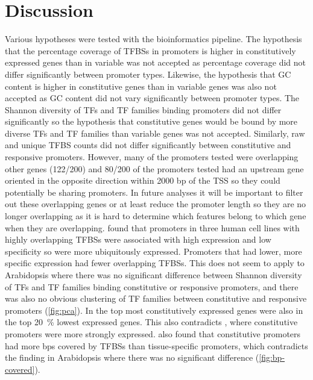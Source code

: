 \section{Discussion}{\label{discussion}}

Various hypotheses were tested with the bioinformatics pipeline. The hypothesis that the percentage coverage of TFBSs in promoters is higher in constitutively expressed genes than in variable was not accepted as percentage coverage did not differ significantly between promoter types.
Likewise, the hypothesis that  GC content is higher in constitutive genes than in variable genes was also not accepted as GC content did not vary significantly between promoter types. 
The Shannon diversity of TFs and TF families binding promoters did not differ significantly so the hypothesis that constitutive genes would be bound by more diverse TFs and TF families than variable genes was not accepted.
Similarly, raw and unique TFBS counts did not differ significantly between constitutive and responsive promoters.
However, many of the promoters tested were overlapping other genes (122/200) and 80/200 of the promoters tested had an upstream gene oriented in the opposite direction within 2000 bp of the TSS so they could potentially be sharing promoters.
In future analyses it will be important to filter out these overlapping genes or at least reduce the promoter length so they are no longer overlapping as it is hard to determine which features belong to which gene when they are overlapping.
\textcite*{mattioliHighthroughputFunctionalAnalysis2019} found that promoters in three human cell lines with highly overlapping TFBSs were associated with high
expression and low specificity so were more ubiquitously expressed.
Promoters that had lower, more specific expression had fewer overlapping TFBSs. This does not seem to apply to Arabidopsis where there was no significant difference between Shannon diversity of TFs and TF families binding constitutive or responsive promoters, and there was also no obvious clustering of TF families between constitutive and responsive promoters (\autoref{fig:pca}).
In \textcite*{czechowskiGenomeWideIdentificationTesting2005} the top most constitutively expressed genes were also in the top \SI{20}{\percent} lowest expressed genes. 
This also contradicts \textcite*{mattioliHighthroughputFunctionalAnalysis2019}, where constitutive promoters were more strongly expressed.
\textcite*{mattioliHighthroughputFunctionalAnalysis2019} also found that constitutive promoters had more bps covered by TFBSs than tissue\hyp{}specific promoters, which contradicts the finding in Arabidopsis where there was no significant difference (\autoref{fig:bp-covered}).

